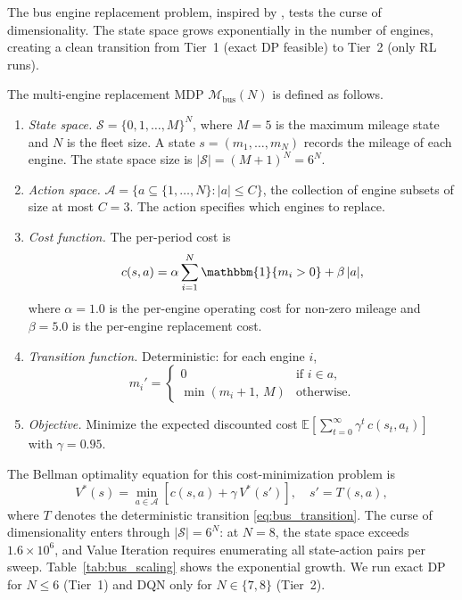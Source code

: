 The bus engine replacement problem, inspired by \citet{Rust1987}, tests the curse of dimensionality. The state space grows exponentially in the number of engines, creating a clean transition from Tier~1 (exact DP feasible) to Tier~2 (only RL runs).

\begin{definition}
\label{def:bus_engine_mdp}
The multi-engine replacement MDP $\mathcal{M}_{\mathrm{bus}}(N)$ is defined as follows.
\begin{enumerate}
    \item \emph{State space.} $\mathcal{S} = \{0, 1, \ldots, M\}^N$, where $M = 5$ is the maximum mileage state and $N$ is the fleet size. A state $s = (m_1, \ldots, m_N)$ records the mileage of each engine. The state space size is $|\mathcal{S}| = (M+1)^N = 6^N$.
    \item \emph{Action space.} $\mathcal{A} = \{a \subseteq \{1, \ldots, N\} : |a| \leq C\}$, the collection of engine subsets of size at most $C = 3$. The action specifies which engines to replace.
    \item \emph{Cost function.} The per-period cost is
    \begin{equation}
    \label{eq:bus_cost}
    c(s, a) = \alpha \sum_{i=1}^{N} \mathbbm{1}\{m_i > 0\} + \beta \, |a|,
    \end{equation}
    where $\alpha = 1.0$ is the per-engine operating cost for non-zero mileage and $\beta = 5.0$ is the per-engine replacement cost.
    \item \emph{Transition function.} Deterministic: for each engine $i$,
    \begin{equation}
    \label{eq:bus_transition}
    m_i' = \begin{cases} 0 & \text{if } i \in a, \\ \min(m_i + 1,\, M) & \text{otherwise.} \end{cases}
    \end{equation}
    \item \emph{Objective.} Minimize the expected discounted cost $\mathbb{E}\left[\sum_{t=0}^{\infty} \gamma^t \, c(s_t, a_t)\right]$ with $\gamma = 0.95$.
\end{enumerate}
\end{definition}

The Bellman optimality equation for this cost-minimization problem is
\begin{equation}
\label{eq:bus_bellman}
V^*(s) = \min_{a \in \mathcal{A}} \left[ c(s, a) + \gamma \, V^*(s') \right], \quad s' = T(s, a),
\end{equation}
where $T$ denotes the deterministic transition \eqref{eq:bus_transition}. The curse of dimensionality enters through $|\mathcal{S}| = 6^N$: at $N = 8$, the state space exceeds $1.6 \times 10^6$, and Value Iteration requires enumerating all state-action pairs per sweep. Table~\ref{tab:bus_scaling} shows the exponential growth. We run exact DP for $N \leq 6$ (Tier~1) and DQN only for $N \in \{7, 8\}$ (Tier~2).


